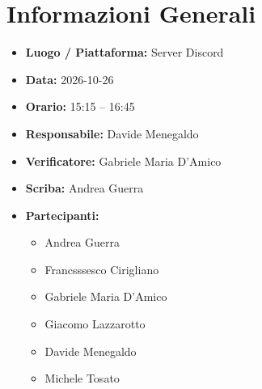 \documentclass[11pt, a4paper]{article}
\newcommand{\DocDate}{2026-10-26}
\begin{document}
\section{Informazioni Generali}
\begin{itemize}
    \item \textbf{Luogo / Piattaforma:} Server Discord
    \item \textbf{Data:} \DocDate
    \item \textbf{Orario:} 15:15 -- 16:45
    \item \textbf{Responsabile:} Davide Menegaldo
    \item \textbf{Verificatore:} Gabriele Maria D'Amico
    \item \textbf{Scriba:} Andrea Guerra
    \item \textbf{Partecipanti:}
        \begin{itemize}
            \item Andrea Guerra
            \item Francsssesco Cirigliano
            \item Gabriele Maria D'Amico
            \item Giacomo Lazzarotto
            \item Davide Menegaldo
            \item Michele Tosato
        \end{itemize}
\end{itemize}
\clearpage
\end{document}
